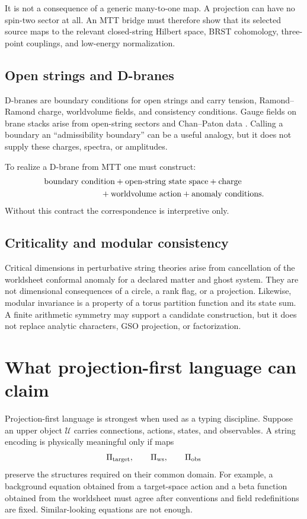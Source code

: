\documentclass[11pt]{article}
\begin{document}
It is not a consequence of a generic many-to-one map. A projection can have
no spin-two sector at all. An MTT bridge must therefore show that its selected
source maps to the relevant closed-string Hilbert space, BRST cohomology,
three-point couplings, and low-energy normalization.

\subsection{Open strings and D-branes}

D-branes are boundary conditions for open strings and carry tension,
Ramond--Ramond charge, worldvolume fields, and consistency conditions. Gauge
fields on brane stacks arise from open-string sectors and Chan--Paton data
\cite{Polchinski2}. Calling a boundary an ``admissibility boundary'' can be a
useful analogy, but it does not supply these charges, spectra, or amplitudes.

To realize a D-brane from MTT one must construct:
\[
\begin{aligned}
 &\text{boundary condition}+\text{open-string state space}+\text{charge}\\
 &\hspace{24mm}+\text{worldvolume action}+\text{anomaly conditions}.
\end{aligned}
\]
Without this contract the correspondence is interpretive only.

\subsection{Criticality and modular consistency}

Critical dimensions in perturbative string theories arise from cancellation
of the worldsheet conformal anomaly for a declared matter and ghost system.
They are not dimensional consequences of a circle, a rank flag, or a
projection. Likewise, modular invariance is a property of a torus partition
function and its state sum. A finite arithmetic symmetry may support a
candidate construction, but it does not replace analytic characters, GSO
projection, or factorization.

\section{What projection-first language can claim}

Projection-first language is strongest when used as a typing discipline.
Suppose an upper object \(\mathcal U\) carries connections, actions, states,
and observables. A string encoding is physically meaningful only if maps
\[
 \Pi_{\rm target},\qquad
 \Pi_{\rm ws},\qquad
 \Pi_{\rm obs}
\]
preserve the structures required on their common domain. For example, a
background equation obtained from a target-space action and a beta function
obtained from the worldsheet must agree after conventions and field
redefinitions are fixed. Similar-looking equations are not enough.
\end{document}
